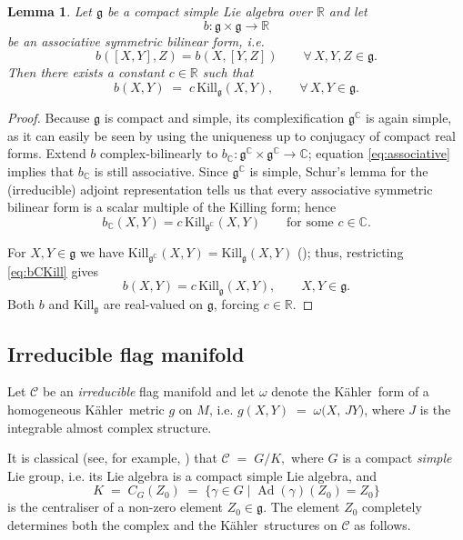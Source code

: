\documentclass[reqno]{amsart}
\newcommand{\R}{\mathds{R}}
\newcommand{\C}{\mathds{C}}
\newcommand{\K}{K\"{a}hler}
\newcommand{\Kill}{{\mathrm{Kill}}}
\newcommand{\Ad}{\operatorname{Ad}}
\newtheorem{lem}[theor]{Lemma}
\begin{document}
\begin{lem}\label{Killingfund}
Let $ \mathfrak{g}$ be a \emph{compact simple} Lie algebra over $\R$ and let  
\[
   b: \mathfrak{g}\times \mathfrak{g}\longrightarrow\R
\]
be an \emph{associative} symmetric bilinear form, i.e.  
\begin{equation}\label{eq:associative}
  b([X,Y],Z)=b(X,[Y,Z])
  \qquad\forall\,X,Y,Z\in \mathfrak{g}.
\end{equation}
Then there exists a constant $c\in\R$ such that
\begin{equation}\label{eq:bKill}
  b(X,Y)\;=\;c\,\Kill_{\mathfrak{g}}(X,Y),
  \qquad\forall\,X,Y\in \mathfrak{g}.
\end{equation}
\end{lem}
\begin{proof}
Because $ \mathfrak{g}$ is compact and simple, its complexification
$ \mathfrak{g}^\C$ is again simple, as it can easily be seen by using the uniqueness up to conjugacy of compact real forms.
Extend $b$ complex-bilinearly to
$b_\C: \mathfrak{g}^\C\times \mathfrak{g}^\C\longrightarrow\C$; 
equation \eqref{eq:associative} implies that $b_\C$ is still associative.
Since $\mathfrak{g}^\C$ is simple, Schur's lemma for the (irreducible) adjoint
representation tells us that every associative symmetric bilinear form is a scalar
multiple of the Killing form; hence
\begin{equation}\label{eq:bCKill}
   b_\C(X,Y)=c\,\Kill_{\mathfrak{g}^\C}(X,Y)
   \qquad\text{for some }c\in\C .
\end{equation}

For $X,Y\in\mathfrak{g}$ we have $\Kill_{\mathfrak{g}^\C}(X,Y)=\Kill_\mathfrak{g}(X,Y)$
(\cite[Lemma~6.1, p.~180]{Helgason}); thus, restricting
\eqref{eq:bCKill} gives
\[
   b(X,Y)=c\,\Kill_{\mathfrak{g}}(X,Y), \qquad X,Y\in\mathfrak{g} .
\]
Both $b$ and $\Kill_{\mathfrak{g}}$ are real-valued on $\mathfrak{g}$, forcing $c\in\R$.
\end{proof}


\subsection{Irreducible flag manifold}
Let \(\mathcal C\) be an \emph{irreducible} flag manifold and let \(\omega\) denote the \K\  form of a homogeneous \K\ metric \(g\) on \(M\), i.e. $g(X,Y)\;=\;\omega\!\bigl(X,\,JY\bigr)$, where $J$
is the integrable almost complex structure.

It is classical (see, for example, \cite{Arva1996flag,BFR1986}) that
$\mathcal C \;=\; G/K,$
where \(G\) is a compact \emph{simple} Lie group, i.e. its Lie algebra is a compact simple Lie algebra,  and
\begin{equation}\label{defK}
   K \;=\; C_G(Z_0) \;=\; \bigl\{\gamma\in G \mid \Ad(\gamma)(Z_0)=Z_0\bigr\}
\end{equation}
is the centraliser of a non-zero element \(Z_0\in\mathfrak{g}\).
The element \(Z_0\) completely determines both the complex and the \K\ structures on \(\mathcal C\) as follows.
\end{document}

